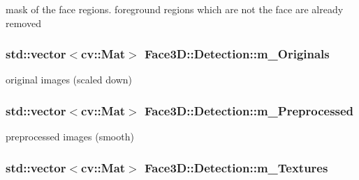 mask of the face regions. foreground regions which are not the face are already removed 

\subsubsection[{\texorpdfstring{m\+\_\+\+Originals}{m_Originals}}]{\setlength{\rightskip}{0pt plus 5cm}std\+::vector$<$cv\+::\+Mat$>$ Face3\+D\+::\+Detection\+::m\+\_\+\+Originals\hspace{0.3cm}{\ttfamily [private]}}\hypertarget{class_face3_d_1_1_detection_a237f409f79b8417f906732dc522322a8}{}\label{class_face3_d_1_1_detection_a237f409f79b8417f906732dc522322a8}


original images (scaled down) 

\subsubsection[{\texorpdfstring{m\+\_\+\+Preprocessed}{m_Preprocessed}}]{\setlength{\rightskip}{0pt plus 5cm}std\+::vector$<$cv\+::\+Mat$>$ Face3\+D\+::\+Detection\+::m\+\_\+\+Preprocessed\hspace{0.3cm}{\ttfamily [private]}}\hypertarget{class_face3_d_1_1_detection_a022bcdfdcfab58bcd2bb4f448d583b3c}{}\label{class_face3_d_1_1_detection_a022bcdfdcfab58bcd2bb4f448d583b3c}


preprocessed images (smooth) 

\subsubsection[{\texorpdfstring{m\+\_\+\+Textures}{m_Textures}}]{\setlength{\rightskip}{0pt plus 5cm}std\+::vector$<$cv\+::\+Mat$>$ Face3\+D\+::\+Detection\+::m\+\_\+\+Textures\hspace{0.3cm}{\ttfamily [private]}}\hypertarget{class_face3_d_1_1_detection_a5dbd240320bc7a4c1661b63e23bee777}{}\label{class_face3_d_1_1_detection_a5dbd240320bc7a4c1661b63e23bee777}


